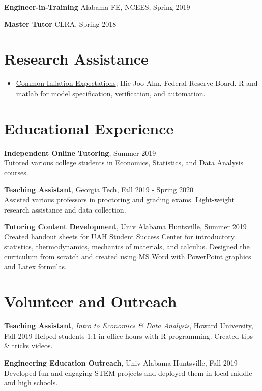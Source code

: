 \documentclass[margin,line]{res}
\begin{document}
\begin{resume}
{\bf Engineer-in-Training} Alabama FE, NCEES, Spring 2019
\vspace*{-3mm}

{\bf Master Tutor} CLRA, Spring 2018
\vspace*{-3mm}

\vspace{.75cm}
\section{\sc Research Assistance}
\begin{itemize}
  \item \href{https://www.federalreserve.gov/econres/notes/feds-notes/research-data-series-index-of-common-inflation-expectations-20210305.htm}{Common Inflation Expectations}; Hie Joo Ahn, Federal Reserve Board. R and matlab for model specification, verification, and automation. 
\end{itemize}

\vspace{.75cm}
 \section{\sc Educational Experience}

    {\bf Independent Online Tutoring}, Summer 2019\\
    {Tutored various college students in Economics, Statistics, and Data Analysis courses.}

    {\bf Teaching Assistant}, Georgia Tech, Fall 2019 - Spring 2020\\
    {Assisted various professors in proctoring and grading exams. Light-weight research assistance and data collection.}
    
    {\bf Tutoring Content Development}, Univ Alabama Huntsville, Summer 2019\\
    {Created handout sheets for UAH Student Success Center for introductory statistics, thermodynamics, mechanics of materials, and calculus. Designed the curriculum from scratch and created using MS Word with PowerPoint graphics and Latex formulas.}

\vspace{.75cm}
\section{\sc Volunteer and Outreach}

{\bf Teaching Assistant}, {\it Intro to Economics & Data Analysis}, Howard University, Fall 2019
{Helped students 1:1 in office hours with R programming. Created tips \& tricks videos.}

{\bf Engineering Education Outreach}, Univ Alabama Huntsville, Fall 2019
{Developed fun and engaging STEM projects and deployed them in local middle and high schools.}


\end{resume}
\end{document}
